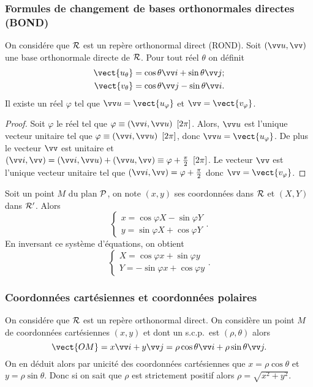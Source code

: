 \subsubsection{Formules de changement de bases orthonormales directes (BOND)}
\label{subsubsec:formuledechangementdeBOND}
On considére que $\Rep$ est un repère orthonormal direct (ROND). Soit $(\vu,\vv)$ une base orthonormale directe de $\Rep$. Pour tout réel $\theta$ on définit
\begin{align}
 \vect{u_\theta}&=\cos \theta \vi + \sin \theta \vj; \\
 \vect{v_\theta}&=\cos \theta \vj -\sin \theta \vi .
\end{align}
Il existe un réel $\varphi$ tel que $\vu=\vect{u_\varphi}$ et $\vv=\vect{v_\varphi}$.
\begin{proof}
  Soit $\varphi$ le réel tel que $\congru{\varphi}{(\vi,\vu)}{2\pi}$. Alors, $\vu$ est l'unique vecteur unitaire tel que $\congru{\varphi}{(\vi,\vu)}{2\pi}$, donc $\vu=\vect{u_\varphi}$. De plus le vecteur $\vv$ est unitaire et $(\vi,\vv)=\congru{(\vi,\vu)+(\vu,\vv)}{\varphi+\frac{\pi}{2}}{2\pi}$. Le vecteur $\vv$ est l'unique vecteur unitaire tel que $(\vi,\vv)=\varphi+\frac{\pi}{2}$ donc $\vv=\vect{v_\varphi}$.
\end{proof}
Soit un point $M$ du plan $\P$, on note $(x,y)$ ses coordonnées dans $\Rep$ et $(X,Y)$ dans $\Rep'$. Alors
\begin{equation}
  \begin{cases}
    x=\cos \varphi X - \sin \varphi Y \\
    y=\sin \varphi X + \cos \varphi Y
  \end{cases}.
\end{equation}
En inversant ce système d'équations, on obtient
\begin{equation}
  \begin{cases}
    X=\cos \varphi x + \sin \varphi y\\
    Y=-\sin \varphi x + \cos \varphi y
  \end{cases}.
\end{equation}
%
\subsubsection{Coordonnées cartésiennes et coordonnées polaires}
\label{subsubsec:coordpoletcoordcart}
On considére que $\Rep$ est un repère orthonormal direct. On considère un point $M$ de coordonnées cartésiennes $(x,y)$ et dont un s.c.p.\ est $(\rho,\theta)$ alors
\begin{equation}
 \vect{OM}=x \vi+y\vj=\rho \cos \theta \vi + \rho \sin \theta \vj.
\end{equation}
On en déduit alors par unicité des coordonnées cartésiennes que $x=\rho \cos \theta$ et $y=\rho \sin \theta$. Donc si on sait que $\rho$ est strictement positif alors $\rho=\sqrt{x^2+y^2}$.
%
